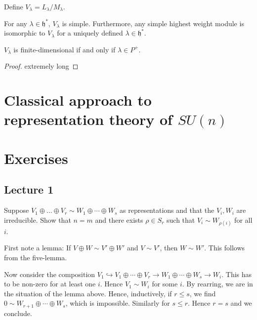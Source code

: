 \documentclass[11pt, english]{article}
\begin{document}
Define $V_\lambda = L_\lambda / M_\lambda$.

\begin{thm}
  For any $\lambda \in \mathfrak h^\ast$, $V_\lambda$ is simple. Furthermore, any simple highest weight module is isomorphic to $V_\lambda$ for a uniquely defined $\lambda \in \mathfrak h^\ast$.
\end{thm}

\begin{prop}
  $V_\lambda$ is finite-dimensional if and only if $\lambda \in P^+$. 
\end{prop}
\begin{proof}
  extremely long
\end{proof}


\newpage
\section{Classical approach to representation theory of $SU(n)$}


\newpage
\appendix
\section{Exercises}

\subsection{Lecture 1}
\begin{exc}
Suppose $V_1 \oplus \ldots \oplus V_r \sim W_1 \oplus \cdots \oplus W_s$ as representations and that the $V_i,W_i$ are irreducible. Show that $n=m$ and there exists $\rho \in S_r$ such that $V_i \sim W_{\rho(i)}$ for all $i$.
\end{exc}
\begin{sol}
First note a lemma: If $V \oplus W \sim V' \oplus W'$ and $V \sim V'$, then $W \sim W'$. This follows from the five-lemma.

Now consider the composition $V_1 \hookrightarrow V_1 \oplus \cdots \oplus V_r  \to W_1 \oplus \cdots \oplus W_s \to W_i$. This has to be non-zero for at least one $i$. Hence $V_1 \sim W_i$ for some $i$. By rearring, we are in the situation of the lemma above. Hence, inductively, if $r \leq s$, we find $0 \sim W_{r+1} \oplus \cdots \oplus W_s$, which is impossible. Similarly for $s \leq r$. Hence $r=s$ and we conclude.
\end{sol}
\end{document}
